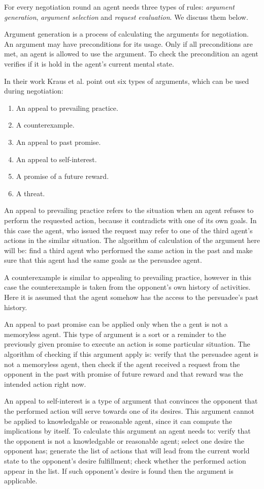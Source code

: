 For every negotiation round an agent needs three types of rules: \emph{argument generation}, \emph{argument selection} and \emph{request evaluation}. We discuss them below.

Argument generation is a process of calculating the arguments for negotiation. An argument may have preconditions for its usage. Only if all preconditions are met, an agent is allowed to use the argument. To check the precondition an agent verifies if it is hold in the agent's current mental state.

In their work Kraus et al. \cite{Kraus_98} point out six types of arguments, which can be used during negotiation:
\begin{enumerate}
  \item An appeal to prevailing practice.
  \item A counterexample.
  \item An appeal to past promise.
  \item An appeal to self-interest.
  \item A promise of a future reward.
  \item A threat.
\end{enumerate}

An appeal to prevailing practice refers to the situation when an agent refuses to perform the requested action, because it contradicts with one of its own goals. In this case the agent, who issued the request may refer to one of the third agent's actions in the similar situation. The algorithm of calculation of the argument here will be: find a third agent who performed the same action in the past and make sure that this agent had the same goals as the persuadee agent.

A counterexample is similar to appealing to prevailing practice, however in this case the counterexample is taken from the opponent's own history of activities. Here it is assumed that the agent somehow has the access to the persuadee's past history.

An appeal to past promise can be applied only when the a gent is not a memoryless agent. This type of argument is a sort or a reminder to the previously given promise to execute an action is some particular situation. The algorithm of checking if this argument apply is: verify that the persuadee agent is not a memoryless agent, then check if the agent received a request from the opponent in the past with promise of future reward and that reward was the intended action right now.

An appeal to self-interest is a type of argument that convinces the opponent that the performed action will serve towards one of its desires. This argument cannot be applied to knowledgable or reasonable agent, since it can compute the implications by itself. To calculate this argument an agent needs to: verify that the opponent is not a knowledgable or reasonable agent; select one desire the opponent has; generate the list of actions that will lead from the current world state to the opponent's desire fulfillment; check whether the performed action appear in the list. If such opponent's desire is found then the argument is applicable.

